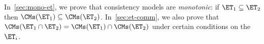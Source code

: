 \noindent In~\cref{sec:mono-et}, we prove that consistency models are 
\emph{monotonic}: 
if  $\ET_1 \subseteq \ET_2$ then $\CMs(\ET_1) \subseteq \CMs(\ET_2)$.
In~\cref{sec:et-comm}, we also prove that  $\CMs(\ET_1 \cap \ET_2) = \CMs(\ET_1) \cap
\CMs(\ET_2)$ under certain conditions on the $\ET_i$.










